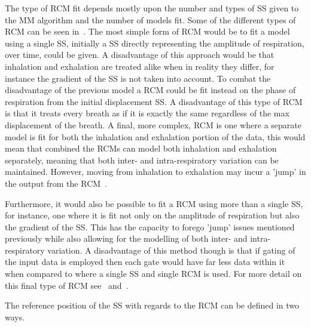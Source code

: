                 The type of \gls{RCM} fit depends mostly upon the number and types of \gls{SS} given to the \gls{MM} algorithm and the number of models fit. Some of the different types of \gls{RCM} can be seen in~. The most simple form of \gls{RCM} would be to fit a model using a single \gls{SS}, initially a \gls{SS} directly representing the amplitude of respiration, over time, could be given. A disadvantage of this approach would be that inhalation and exhalation are treated alike when in reality they differ, for instance the gradient of the \gls{SS} is not taken into account. To combat the disadvantage of the previous model a \gls{RCM} could be fit instead on the phase of respiration from the initial displacement \gls{SS}. A disadvantage of this type of \gls{RCM} is that it treats every breath as if it is exactly the same regardless of the max displacement of the breath. A final, more complex, \gls{RCM} is one where a separate model is fit for both the inhalation and exhalation portion of the data, this would mean that combined the \glspl{RCM} can model both inhalation and exhalation separately, meaning that both inter- and intra-respiratory variation can be maintained. However, moving from inhalation to exhalation may incur a 'jump' in the output from the \gls{RCM}~\parencite{McClelland2013}.
                
                Furthermore, it would also be possible to fit a \gls{RCM} using more than a single \gls{SS}, for instance, one where it is fit not only on the amplitude of respiration but also the gradient of the \gls{SS}. This has the capacity to forego 'jump' issues mentioned previously while also allowing for the modelling of both inter- and intra-respiratory variation. A disadvantage of this method though is that if gating of the input data is employed then each gate would have far less data within it when compared to where a single \gls{SS} and single \gls{RCM} is used. For more detail on this final type of \gls{RCM} see~ and~.
                
                The reference position of the \gls{SS} with regards to the \gls{RCM} can be defined in two ways.
            
